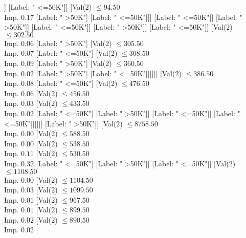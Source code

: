 \documentclass[margin=10pt]{standalone}
\begin{document}
\begin{forest}
																							[Label: " >50K"]]
																						[Label: " <=50K"]]
																					[Val($2$) $ \leq 94.50$ \\ Imp. $0.17$
																						[Label: " >50K"]
																						[Label: " <=50K"]]]
																				[Label: " <=50K"]]
																			[Label: " >50K"]]
																		[Label: " <=50K"]]
																	[Label: " >50K"]]
																[Label: " <=50K"]]
															[Val($2$) $ \leq 302.50$ \\ Imp. $0.06$
																[Label: " >50K"]
																[Val($2$) $ \leq 305.50$ \\ Imp. $0.07$
																	[Label: " <=50K"]
																	[Val($2$) $ \leq 308.50$ \\ Imp. $0.09$
																		[Label: " >50K"]
																		[Val($2$) $ \leq 360.50$ \\ Imp. $0.02$
																			[Label: " >50K"]
																			[Label: " <=50K"]]]]]]
														[Val($2$) $ \leq 386.50$ \\ Imp. $0.08$
															[Label: " <=50K"]
															[Val($2$) $ \leq 476.50$ \\ Imp. $0.06$
																[Val($2$) $ \leq 456.50$ \\ Imp. $0.03$
																	[Val($2$) $ \leq 433.50$ \\ Imp. $0.02$
																		[Label: " <=50K"]
																		[Label: " >50K"]]
																	[Label: " <=50K"]]
																[Label: " <=50K"]]]]]]
											[Label: " >50K"]]
										[Val($2$) $ \leq 8758.50$ \\ Imp. $0.00$
											[Val($2$) $ \leq 588.50$ \\ Imp. $0.00$
												[Val($2$) $ \leq 538.50$ \\ Imp. $0.11$
													[Val($2$) $ \leq 530.50$ \\ Imp. $0.32$
														[Label: " <=50K"]
														[Label: " >50K"]]
													[Label: " <=50K"]]
												[Val($2$) $ \leq 1108.50$ \\ Imp. $0.00$
													[Val($2$) $ \leq 1104.50$ \\ Imp. $0.03$
														[Val($2$) $ \leq 1099.50$ \\ Imp. $0.01$
															[Val($2$) $ \leq 967.50$ \\ Imp. $0.01$
																[Val($2$) $ \leq 899.50$ \\ Imp. $0.02$
																	[Val($2$) $ \leq 890.50$ \\ Imp. $0.02$

\end{forest}
\end{document}
